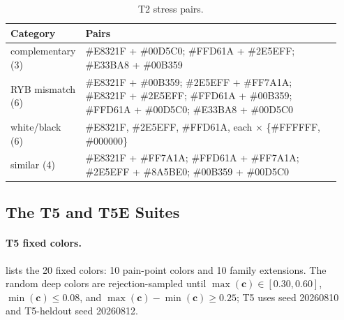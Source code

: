 \begin{table}[t]
\centering
\footnotesize
\setlength{\tabcolsep}{3pt}
\caption{T2 stress pairs.}
\label{tab:t2}
\begin{tabular}{p{0.16\linewidth}p{0.78\linewidth}}
\toprule
Category & Pairs \\
\midrule
complementary (3) & \#E8321F + \#00D5C0; \#FFD61A + \#2E5EFF; \#E33BA8 + \#00B359 \\
RYB mismatch (6) & \#E8321F + \#00B359; \#2E5EFF + \#FF7A1A; \#E8321F + \#2E5EFF; \#FFD61A + \#00B359; \#FFD61A + \#00D5C0; \#E33BA8 + \#00D5C0 \\
white/black (6) & \#E8321F, \#2E5EFF, \#FFD61A, each $\times$ \{\#FFFFFF, \#000000\} \\
similar (4) & \#E8321F + \#FF7A1A; \#FFD61A + \#FF7A1A; \#2E5EFF + \#8A5BE0; \#00B359 + \#00D5C0 \\
\bottomrule
\end{tabular}
\end{table}

\subsection{The T5 and T5E Suites}
\label{app:t5}

\paragraph{T5 fixed colors.}
 lists the 20 fixed colors: 10 pain-point colors and 10 family extensions. The random deep colors are rejection-sampled until $\max(\mathbf{c})\in[0.30,0.60]$, $\min(\mathbf{c})\le0.08$, and $\max(\mathbf{c})-\min(\mathbf{c})\ge0.25$; T5 uses seed 20260810 and T5-heldout seed 20260812.

